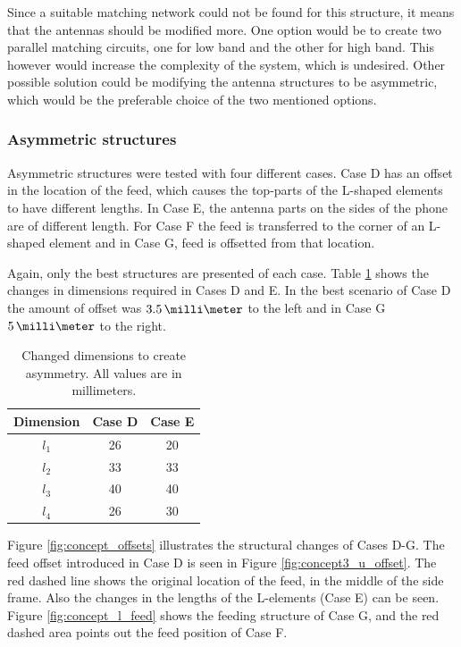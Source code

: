 Since a suitable matching network could not be found for this structure, it means that the antennas should be modified more. One option would be to create two parallel matching circuits, one for low band and the other for high band. This however would increase the complexity of the system, which is undesired. Other possible solution could be modifying the antenna structures to be asymmetric, which would be the preferable choice of the two mentioned options.


\subsubsection{Asymmetric structures}
\label{sec:asymmetric_structures}
Asymmetric structures were tested with four different cases. Case D has an offset in the location of the feed, which causes the top-parts of the L-shaped elements to have different lengths. In Case E, the antenna parts on the sides of the phone are of different length. For Case F the feed is transferred to the corner of an L-shaped element and in Case G, feed is offsetted from that location.

Again, only the best structures are presented of each case. Table \ref{tab:concept3} shows the changes in dimensions required in Cases D and E. In the best scenario of Case D the amount of offset was $3.5\,\milli\meter$ to the left and in Case G $5\,\milli\meter$ to the right. 
\begin{table}[H]
    \centering
    \caption{Changed dimensions to create asymmetry. All values are in millimeters.}
    \label{tab:concept3}
    \begin{tabular}{|c|c|c|}
        \hline
        \textbf{Dimension} & \textbf{Case D} & \textbf{Case E}\\
        \hline
        $l_1$ & 26 & 20 \\
        \hline
        $l_2$ & 33 & 33\\
        \hline
        $l_3$ & 40 & 40\\
        \hline
        $l_4$ & 26 & 30\\
        \hline
    \end{tabular}
\end{table}

Figure \ref{fig:concept_offsets} illustrates the structural changes of Cases D-G. The feed offset introduced in Case D is seen in Figure \ref{fig:concept3_u_offset}. The red dashed line shows the original location of the feed, in the middle of the side frame. Also the changes in the lengths of the L-elements (Case E) can be seen. Figure \ref{fig:concept_l_feed} shows the feeding structure of Case G, and the red dashed area points out the feed position of Case F.


